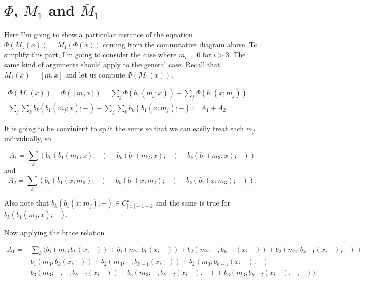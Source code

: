 \documentclass[twoside]{article}
\begin{document}

\section{$\Phi$, $M_1$ and $\overline{M}_1$}

Here I'm going to show a particular instance of the equation $\Phi(M_1(x))=\overline{M}_1(\Phi(x))$ coming from the commutative diagram above. To simplify this part, I'm going to consider the case where $m_i=0$ for $i>3$. The same kind of arguments should apply to the general case. Recall that $M_1(x)=[m,x]$ and let us compute $\Phi(M_1(x)).$ 

\begin{align}
\Phi(M_1(x))=\Phi([m,x])=\sum_j\Phi(b_1(m_j;x))+\sum_j\Phi(b_1(x;m_j))=\nonumber\\
\sum_j\sum_k b_k(b_1(m_j;x);-)+\sum_j\sum_k b_k(b_1(x;m_j);-)\coloneqq A_1+A_2
\end{align}



It is going to be convinient to split the sums so that we can easily treat each $m_j$ individually, so

$$A_1=\sum_k (b_k(b_1(m_1;x);-)+b_k(b_1(m_2;x);-)+b_k(b_1(m_3;x);-))$$
and
$$A_2=\sum_k (b_k(b_1(x;m_1);-)+b_k(b_1(x;m_2);-)+b_k(b_1(x;m_3);-)).$$

Also note that $b_k(b_1(x;m_j);-)\in C^k_{||x||+1-k}$ and the same is true for $b_k(b_1(m_j;x);-)$. %

Now applying the brace relation

\begin{align*}
A_1=&\sum_k ( b_1(m_1;b_k(x;-))+b_1(m_2;b_k(x;-))+b_2(m_2;-,b_{k-1}(x;-))+b_2(m_2;b_{k-1}(x;-),-)+\\
&b_1(m_3;b_k(x;-))+b_2(m_3;-,b_{k-1}(x;-))+b_2(m_3;b_{k-1}(x;-),-)+\\
& b_3(m_3;-,-,b_{k-2}(x;-))+b_3(m_3;-,b_{k-2}(x;-),-)+b_3(m_3;b_{k-2}(x;-),-,-)).
\end{align*}


\end{document}

